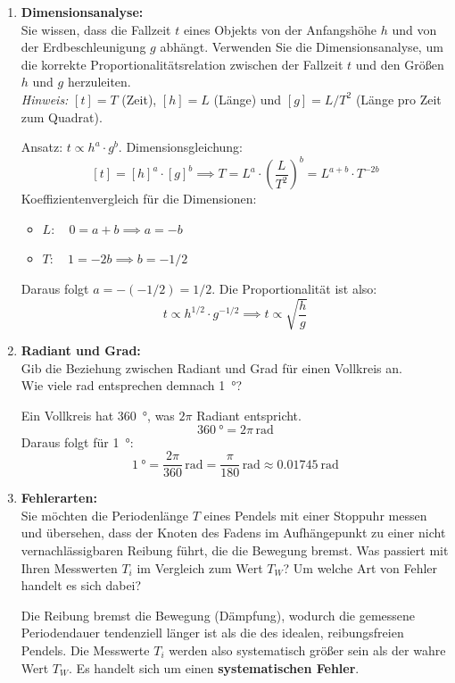 \documentclass[11pt, a4paper]{article}
\begin{document}
\begin{enumerate}[label=\textbf{\arabic*.},itemsep=0.50cm]
    \item \textbf{Dimensionsanalyse:} \\
    Sie wissen, dass die Fallzeit $t$ eines Objekts von der Anfangshöhe $h$ und von der Erdbeschleunigung $g$ abhängt.
    Verwenden Sie die Dimensionsanalyse, um die korrekte Proportionalitätsrelation zwischen der Fallzeit $t$ und den Größen $h$ und $g$ herzuleiten. \\
    \textit{Hinweis:} $[t] = T$  (Zeit), $[h] = L$ (Länge) und $[g] = L/T^2$ (Länge pro Zeit zum Quadrat).
    \begin{solutionbox}
        Ansatz: $t \propto h^a \cdot g^b$.
        Dimensionsgleichung:
        \[ [t] = [h]^a \cdot [g]^b \implies T = L^a \cdot \left(\frac{L}{T^2}\right)^b = L^{a+b} \cdot T^{-2b} \]
        Koeffizientenvergleich für die Dimensionen:
        \begin{itemize}
            \item $L: \quad 0 = a+b \implies a = -b$
            \item $T: \quad 1 = -2b \implies b = -1/2$
        \end{itemize}
        Daraus folgt $a = -(-1/2) = 1/2$. Die Proportionalität ist also:
        \[ t \propto h^{1/2} \cdot g^{-1/2} \implies t \propto \sqrt{\frac{h}{g}} \]
    \end{solutionbox}
    
    \item \textbf{Radiant und Grad:} \\
    Gib die Beziehung zwischen Radiant und Grad für einen Vollkreis an. \\
    Wie viele \si{\radian} entsprechen demnach \SI{1}{\degree}?
    \begin{solutionbox}
        Ein Vollkreis hat \SI{360}{\degree}, was $2\pi$ Radiant entspricht.
        \[ \SI{360}{\degree} = 2\pi \, \si{\radian} \]
        Daraus folgt für \SI{1}{\degree}:
        \[ \SI{1}{\degree} = \frac{2\pi}{360} \, \si{\radian} = \frac{\pi}{180} \, \si{\radian} \approx \SI{0.01745}{\radian} \]
    \end{solutionbox}
    
    \item \textbf{Fehlerarten:} \\
    Sie möchten die Periodenlänge $T$ eines Pendels mit einer Stoppuhr messen und übersehen, dass der Knoten des Fadens im Aufhängepunkt zu einer nicht vernachlässigbaren Reibung führt, die die Bewegung bremst. 
    Was passiert mit Ihren Messwerten $T_i$ im Vergleich zum Wert $T_W$? Um welche Art von Fehler handelt es sich dabei? 
    \begin{solutionbox}
        Die Reibung bremst die Bewegung (Dämpfung), wodurch die gemessene Periodendauer tendenziell länger ist als die des idealen, reibungsfreien Pendels. Die Messwerte $T_i$ werden also systematisch größer sein als der wahre Wert $T_W$.
        Es handelt sich um einen \textbf{systematischen Fehler}.
    \end{solutionbox}
    

\end{enumerate}
\end{document}

